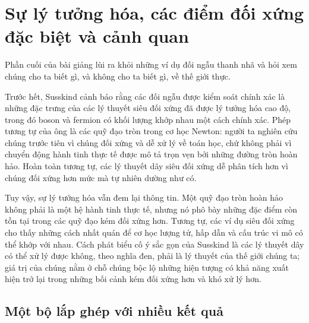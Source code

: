 \begin{classroomqa}
\end{classroomqa}

\section{Sự lý tưởng hóa, các điểm đối xứng đặc biệt và cảnh quan}

Phần cuối của bài giảng lùi ra khỏi những ví dụ đối ngẫu thanh nhã và hỏi xem chúng cho ta biết gì, và không cho ta biết gì, về thế giới thực.

Trước hết, Susskind cảnh báo rằng các đối ngẫu được kiểm soát chính xác là những đặc trưng của các lý thuyết siêu đối xứng đã được lý tưởng hóa cao độ, trong đó boson và fermion có khối lượng khớp nhau một cách chính xác. Phép tương tự của ông là các quỹ đạo tròn trong cơ học Newton: người ta nghiên cứu chúng trước tiên vì chúng đối xứng và dễ xử lý về toán học, chứ không phải vì chuyển động hành tinh thực tế được mô tả trọn vẹn bởi những đường tròn hoàn hảo. Hoàn toàn tương tự, các lý thuyết dây siêu đối xứng dễ phân tích hơn vì chúng đối xứng hơn mức mà tự nhiên dường như có.

Tuy vậy, sự lý tưởng hóa vẫn đem lại thông tin. Một quỹ đạo tròn hoàn hảo không phải là một hệ hành tinh thực tế, nhưng nó phô bày những đặc điểm còn tồn tại trong các quỹ đạo kém đối xứng hơn. Tương tự, các ví dụ siêu đối xứng cho thấy những cách nhất quán để cơ học lượng tử, hấp dẫn và cấu trúc vi mô có thể khớp với nhau. Cách phát biểu cố ý sắc gọn của Susskind là các lý thuyết dây có thể xử lý được không, theo nghĩa đen, phải là lý thuyết của thế giới chúng ta; giá trị của chúng nằm ở chỗ chúng bộc lộ những hiện tượng có khả năng xuất hiện trở lại trong những bối cảnh kém đối xứng hơn và khó xử lý hơn.

\subsection{Một bộ lắp ghép với nhiều kết quả}

